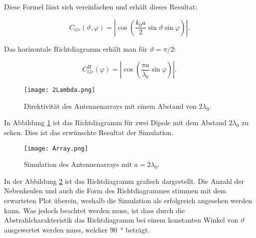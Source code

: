 Diese Formel lässt sich vereinfachen und erhält dieses Resultat:

\begin{equation}
C_{Gr}(\vartheta,\varphi) = \left|  \cos \left( \dfrac{k_{0} a}{2} \sin \vartheta \sin\varphi \right) \right|.
\end{equation} 

Das horizontale Richtdiagramm erhält man für $ \vartheta = \pi / 2 $:

\begin{equation}
C_{Gr}^{H}(\varphi) = \left|  \cos \left( \dfrac{\pi a}{\lambda_{0}} \sin \varphi \right) \right|.
\end{equation} 

\begin{figure}[!ht]
	\centering
	\texttt{[image: 2Lambda.png]}
	\caption{Direktivität des Antennenarrays mit einem Abstand von $2\lambda_0$.}\label{fig:2Lambda}
\end{figure}

In Abbildung \ref{fig:2Lambda} ist das Richtdiagramm für zwei Dipole mit dem Abstand $2\lambda_0$ zu sehen. Dies ist das erwünschte Resultat der Simulation.

\newpage

\begin{figure}[!ht]
	\centering
	\texttt{[image: Array.png]}
	\caption{Simulation des Antennenarrays mit $a = 2\lambda_0$.}\label{fig:Array}
\end{figure}

In der Abbildung \ref{fig:Array} ist das Richtdiagramm grafisch dargestellt. Die Anzahl der Nebenkeulen und auch die Form des Richtdiagrammes stimmen mit dem erwarteten Plot überein, weshalb die Simulation als erfolgreich angesehen werden kann. Was jedoch beachtet werden muss, ist dass durch die Abstrahlcharakteristik das Richtdiagramm bei einem konstanten Winkel von $\vartheta$ ausgewertet werden muss, welcher \SI{90}{\degree} beträgt.